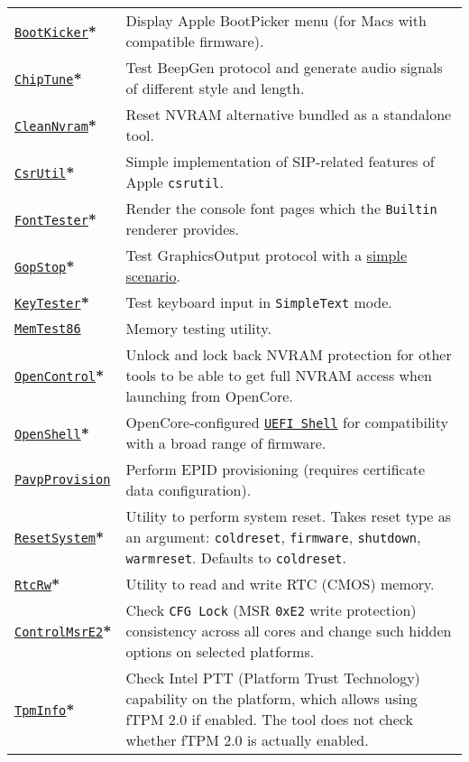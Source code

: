 \documentclass[]{article}
\begin{document}
\begin{tabular}{p{1.3in}p{5.55in}}
\href{https://github.com/acidanthera/OpenCorePkg}{\texttt{BootKicker}}\textbf{*}
& Display Apple BootPicker menu (for Macs with compatible firmware). \\
\href{https://github.com/acidanthera/OpenCorePkg}{\texttt{ChipTune}}\textbf{*}
& Test BeepGen protocol and generate audio signals of different style and length. \\
\href{https://github.com/acidanthera/OpenCorePkg}{\texttt{CleanNvram}}\textbf{*}
& Reset NVRAM alternative bundled as a standalone tool. \\
\href{https://github.com/acidanthera/OpenCorePkg}{\texttt{CsrUtil}}\textbf{*}
& Simple implementation of SIP-related features of Apple \texttt{csrutil}. \\
\href{https://github.com/acidanthera/OpenCorePkg}{\texttt{FontTester}}\textbf{*}
& Render the console font pages which the \texttt{Builtin} renderer provides. \\
\href{https://github.com/acidanthera/OpenCorePkg}{\texttt{GopStop}}\textbf{*}
& Test GraphicsOutput protocol with a
  \href{https://github.com/acidanthera/OpenCorePkg/tree/master/Application/GopStop}{simple scenario}. \\
\href{https://github.com/acidanthera/OpenCorePkg}{\texttt{KeyTester}}\textbf{*}
& Test keyboard input in \texttt{SimpleText} mode. \\
\href{https://www.memtest86.com}{\texttt{MemTest86}}
& Memory testing utility. \\
\href{https://github.com/acidanthera/OpenCorePkg}{\texttt{OpenControl}}\textbf{*}
& Unlock and lock back NVRAM protection for other tools to be able to get full NVRAM access
  when launching from OpenCore. \\
\href{https://github.com/acidanthera/OpenCorePkg}{\texttt{OpenShell}}\textbf{*}
& OpenCore-configured \href{http://github.com/tianocore/edk2}{\texttt{UEFI Shell}} for compatibility
  with a broad range of firmware. \\
\href{https://github.com/acidanthera/OpenCorePkg}{\texttt{PavpProvision}}
& Perform EPID provisioning (requires certificate data configuration). \\
\href{https://github.com/acidanthera/OpenCorePkg}{\texttt{ResetSystem}}\textbf{*}
& Utility to perform system reset. Takes reset type as an argument:
  \texttt{coldreset}, \texttt{firmware}, \texttt{shutdown}, \texttt{warmreset}.
  Defaults to \texttt{coldreset}. \\
\href{https://github.com/acidanthera/OpenCorePkg}{\texttt{RtcRw}}\textbf{*}
& Utility to read and write RTC (CMOS) memory. \\
\href{https://github.com/acidanthera/OpenCorePkg}{\texttt{ControlMsrE2}}\textbf{*}
& Check \texttt{CFG Lock} (MSR \texttt{0xE2} write protection) consistency
across all cores and change such hidden options on selected platforms. \\
\href{https://github.com/acidanthera/OpenCorePkg}{\texttt{TpmInfo}}\textbf{*}
& Check Intel PTT (Platform Trust Technology) capability on the platform,
which allows using fTPM 2.0 if enabled. The tool does not check whether fTPM 2.0
is actually enabled.
\end{tabular}
\end{document}
